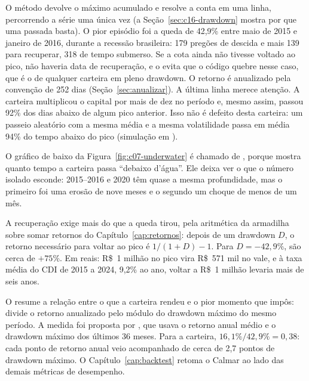 O método  devolve o máximo acumulado e resolve a conta em uma linha, percorrendo a série uma única vez (a Seção~\ref{sec:c16-drawdown} mostra por que uma passada basta). O pior episódio foi a queda de 42,9\% entre maio de 2015 e janeiro de 2016, durante a recessão brasileira: 179 pregões de descida e mais 139 para recuperar, 318 de tempo submerso. Se a cota ainda não tivesse voltado ao pico, não haveria data de recuperação, e o  evita que o código quebre nesse caso, que é o de qualquer carteira em pleno drawdown. O retorno é anualizado pela convenção de 252 dias (Seção~\ref{sec:anualizar}). A última linha merece atenção. A carteira multiplicou o capital por mais de dez no período e, mesmo assim, passou 92\% dos dias abaixo de algum pico anterior. Isso não é defeito desta carteira: um passeio aleatório com a mesma média e a mesma volatilidade passa em média 94\% do tempo abaixo do pico (simulação em ).


O gráfico de baixo da Figura~\ref{fig:c07-underwater} é chamado de , porque mostra quanto tempo a carteira passa ``debaixo d'água''. Ele deixa ver o que o número isolado esconde: 2015--2016 e 2020 têm quase a mesma profundidade, mas o primeiro foi uma erosão de nove meses e o segundo um choque de menos de um mês.

A recuperação exige mais do que a queda tirou, pela aritmética da armadilha sobre somar retornos do Capítulo~\ref{cap:retornos}: depois de um drawdown $D$, o retorno necessário para voltar ao pico é $1/(1+D) - 1$. Para $D = -42,9\%$, são cerca de $+75\%$. Em reais: R\$~1 milhão no pico vira R\$~571 mil no vale, e à taxa média do CDI de 2015 a 2024, 9,2\% ao ano, voltar a R\$~1 milhão levaria mais de seis anos.

O  resume a relação entre o que a carteira rendeu e o pior momento que impôs: divide o retorno anualizado pelo módulo do drawdown máximo do mesmo período. A medida foi proposta por \citet{young1991}, que usava o retorno anual médio e o drawdown máximo dos últimos 36 meses. Para a carteira, $16,1\% / 42,9\% = 0,38$: cada ponto de retorno anual veio acompanhado de cerca de 2,7 pontos de drawdown máximo. O Capítulo~\ref{cap:backtest} retoma o Calmar ao lado das demais métricas de desempenho.

